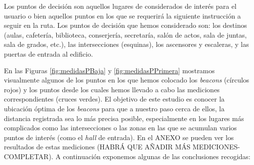 Los puntos de decisión son aquellos lugares de considerados de interés para el usuario o bien aquellos puntos en los que se requerirá la siguiente instrucción a seguir en la ruta. Los puntos de decisión que hemos considerado son: los destinos (aulas, cafetería, biblioteca, conserjería, secretaría, salón de actos, sala de juntas, sala de grados, etc.), las intersecciones (esquinas), los ascensores y escaleras, y las puertas de entrada al edificio.

En las Figuras \ref{fig:medidasPBaja} y \ref{fig:medidasPPrimera} mostramos visualmente algunos de los puntos en los que hemos colocado los \textit{beacons} (círculos rojos) y los puntos desde los cuales hemos llevado a cabo las mediciones correspondientes (cruces verdes). El objetivo de este estudio es conocer la ubicación óptima de los \textit{beacons} para que a nuestro paso cerca de ellos, la distancia registrada sea lo más precisa posible, especialmente en los lugares más complicados como las intersecciones o las zonas en las que se acumulan varios puntos de interés (como el \textit{hall} de entrada). En el ANEXO se pueden ver los resultados de estas mediciones (HABRÁ QUE AÑADIR MÁS MEDICIONES-COMPLETAR). A continuación exponemos algunas de las conclusiones recogidas:

